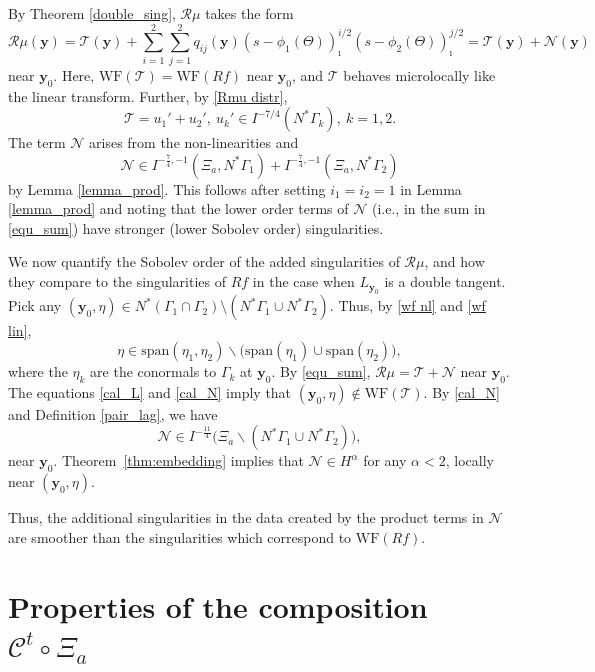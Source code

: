 \documentclass[11pt]{article}
\newcommand{\be}{\begin{equation}}
\newcommand{\ee}{\end{equation}}
\newcommand{\cC}{\mathcal C}
\newcommand{\WF}{\mathrm{WF}}
\newcommand{\br}{\mathbb{R}}
\numberwithin{equation}{section}
\newcommand{\vy}{\mathbf{y}}
\theoremstyle{definition}
\begin{document}
By Theorem \ref{double_sing}, $\mathcal{R}\mu$ takes the form
\be
\label{equ_sum}
\mathcal{R}\mu(\vy) = \mathcal{T}(\vy) + \sum_{i=1}^2\sum_{j=1}^2q_{ij}(\vy)(s - \phi_1(\Theta))_\imath^{i/2}(s - \phi_2(\Theta))_\imath^{j/2} = \mathcal{T}(\vy) + \mathcal{N}(\vy)
\ee
near $\vy_0$. Here, $\WF(\mathcal{T}) = \WF(Rf)$ near $\vy_0$, and $\mathcal{T}$ behaves microlocally like the linear transform. Further, by \eqref{Rmu distr},
\be\label{cal_L}
\mathcal{T} = u_1' + u_2',\ u_k' \in I^{-7/4}(N^*\Gamma_k),\ k=1,2. 
\ee
The term $\mathcal{N}$ arises from the non-linearities and 
\be
\label{cal_N}
\mathcal{N}\in I^{-\frac{7}{4},-1}(\Xi_a, N^*\Gamma_1) + I^{-\frac{7}{4},-1}(\Xi_a, N^*\Gamma_2)
\ee
by Lemma \ref{lemma_prod}. This follows after setting $i_1 = i_2 = 1$ in Lemma \ref{lemma_prod} and noting that the lower order terms of $\mathcal{N}$ (i.e., in the sum in \eqref{equ_sum}) have stronger (lower Sobolev order) singularities.

We now quantify the Sobolev order of the added singularities of $\mathcal{R}\mu$, and how they compare to the singularities of $Rf$ in the case when $L_{\vy_0}$ is a double tangent. Pick any $(\vy_0,\eta)\in N^*(\Gamma_1\cap\Gamma_2)\setminus(N^*\Gamma_1\cup N^*\Gamma_2)$. Thus, by \eqref{wf nl} and \eqref{wf lin},
\be
\eta \in \text{span}(\eta_1,\eta_2)\backslash \big(\text{span}(\eta_1) \cup \text{span}(\eta_2)\big),
\ee
where the $\eta_k$ are the conormals to $\Gamma_k$ at $\vy_0$. By \eqref{equ_sum}, $\mathcal{R}\mu = \mathcal{T} + \mathcal{N}$ near $\vy_0$. The equations \eqref{cal_L} and \eqref{cal_N} imply that $(\vy_0,\eta)\notin \WF(\mathcal{T})$.
By \eqref{cal_N} and Definition \ref{pair_lag}, we have
\be
\mathcal{N} \in I^{-\frac{11}{4}}\big( \Xi_a \backslash (N^*\Gamma_1\cup N^*\Gamma_2)\big),
\ee
near $\vy_0$. Theorem~\ref{thm:embedding} implies that $\mathcal{N}\in H^{\alpha}$ for any $\alpha < 2$, locally near $(\vy_0, \eta)$.

Thus, the additional singularities in the data created by the product terms in $\mathcal{N}$ are smoother than the singularities which correspond to $\WF(Rf)$.


\section{Properties of the composition $\cC^t\circ\Xi_a$}\label{sec:props comp}
\end{document}
